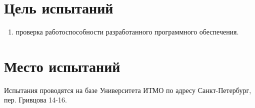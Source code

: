 \section{Цель испытаний}

\begin{enumerate}
    \item проверка работоспособности разработанного программного обеспечения.
\end{enumerate}


\section{Место испытаний}

Испытания проводятся на базе Университета ИТМО по адресу Санкт-Петербург, пер. Гривцова 14-16.
